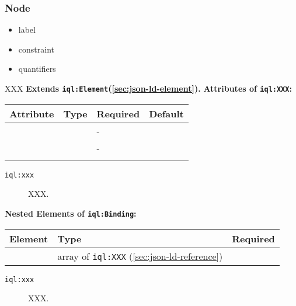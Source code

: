 \documentclass[11pt]{article}
\newcommand{\iqlns}{iql:}
\newcommand{\iqlType}[1]{\texttt{\iqlns#1}}
\newcommand{\attributes}[1]{\noindent\textbf{Attributes of \iqlType{#1}:}\newline\medskip}
\newcommand{\elements}[1]{\noindent\textbf{Nested Elements of \iqlType{#1}:}\newline\medskip}
\newcommand{\desc}[1]{\noindent#1\newline\medskip}
\newcommand{\extends}[2]{\noindent\textbf{Extends \iqlType{#1}(#2).}\newline\medskip}
\begin{document}
\subsubsection{Node}
\label{sec:json-ld-node}
\begin{itemize}
\item label
\item constraint
\item quantifiers
\end{itemize}
\desc{XXX}
\extends{Element}{\ref{sec:json-ld-element}}
\attributes{XXX}
\begin{tabular}{|p{}|p{}|p{}|p{}|}
	\hline
	\textbf{Attribute} & \textbf{Type} & \textbf{Required} & \textbf{Default} \\ 
	\hline
	\hline
	&  & - &  \\ 
	\hline 
	&  & - &  \\ 
	\hline 
	&  &  & \\ 
	\hline 
\end{tabular}
\begin{description}
	\item[\iqlType{xxx}] XXX.
\end{description}
\elements{Binding}
\begin{tabular}{|p{}|p{}|p{}|}
	\hline
	\textbf{Element} & \textbf{Type} & \textbf{Required} \\ 
	\hline
	\hline 
	& array of \iqlType{XXX} (\ref{sec:json-ld-reference}) &  \\ 
	\hline 
\end{tabular}
\begin{description}
	\item[\iqlType{xxx}] XXX.
\end{description}

\end{document}
